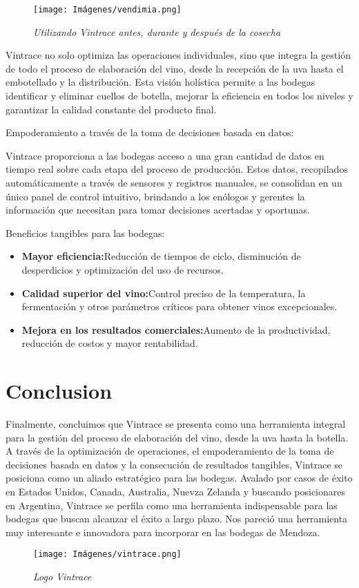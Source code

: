  \begin{figure}[h!]
    \centering
    \texttt{[image: Imágenes/vendimia.png]}
    \caption{\textit{Utilizando Vintrace antes, durante y después de la cosecha}}
    \label{exemploLabel}
    \end{figure}
Vintrace no solo optimiza las operaciones individuales, sino que integra la gestión de todo el proceso de elaboración del vino, desde la recepción de la uva hasta el embotellado y la distribución. Esta visión holística permite a las bodegas identificar y eliminar cuellos de botella, mejorar la eficiencia en todos los niveles y garantizar la calidad constante del producto final.

Empoderamiento a través de la toma de decisiones basada en datos:

Vintrace proporciona a las bodegas acceso a una gran cantidad de datos en tiempo real sobre cada etapa del proceso de producción. Estos datos, recopilados automáticamente a través de sensores y registros manuales, se consolidan en un único panel de control intuitivo, brindando a los enólogos y gerentes la información que necesitan para tomar decisiones acertadas y oportunas.

Beneficios tangibles para las bodegas:
\begin{itemize}
\item \textbf{Mayor eficiencia:}Reducción de tiempos de ciclo, disminución de desperdicios y optimización del uso de recursos.
\item \textbf{Calidad superior del vino:}Control preciso de la temperatura, la fermentación y otros parámetros críticos para obtener vinos excepcionales.
\item \textbf{Mejora en los resultados comerciales:}Aumento de la productividad, reducción de costos y mayor rentabilidad.
\end{itemize}



\section{Conclusion}
Finalmente, concluimos que Vintrace se presenta como una herramienta integral para la gestión del proceso de elaboración del vino, desde la uva hasta la botella. A través de la optimización de operaciones, el empoderamiento de la toma de decisiones basada en datos y la consecución de resultados tangibles, Vintrace se posiciona como un aliado estratégico para las bodegas.
Avalado por casos de éxito en Estados Unidos, Canada, Australia, Nuevza Zelanda y buscando posicionares en Argentina, Vintrace se perfila como una herramienta indispensable para las bodegas que buscan alcanzar el éxito a largo plazo.
Nos pareció una herramienta muy interesante e innovadora para incorporar en las bodegas de Mendoza.


\begin{figure}[h!]
    \centering
    \texttt{[image: Imágenes/vintrace.png]}
    \caption{\textit{Logo Vintrace}}
    \label{exemploLabel}
    \end{figure}